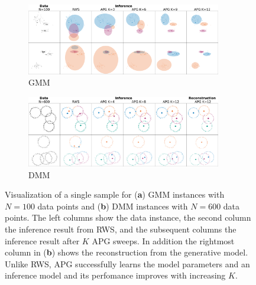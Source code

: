 \documentclass{article}
\theoremstyle{definition}
\begin{document}
\begin{figure}[t!]
  \centering
  \begin{subfigure}[t]{0.5\textwidth}
  \includegraphics[width=85mm]{figures/gmm_samples_2datasets.pdf}
  \vspace*{-1mm}
  \caption{GMM}
  \label{fig:samples-gmm}
  \vspace{-1ex}
  \end{subfigure}%
  \begin{subfigure}[t]{0.5\textwidth}
  \includegraphics[width=85mm]{figures/dgmm_samples_2datasets.pdf}
  \vspace*{-1mm}
  \caption{DMM}
  \label{fig:samples-dgmm}
  \vspace{-1ex}
  \end{subfigure}
  \caption{Visualization of a single sample for (\textbf{a}) GMM instances with $N=100$ data points and (\textbf{b}) DMM instances with $N=600$ data points. The left columns show the data instance, the second column the inference result from RWS, and the subsequent columns the inference result after $K$ APG sweeps. In addition the rightmost column in (\textbf{b}) shows the reconstruction from the generative model.
  Unlike RWS, APG successfully learns the model parameters and an inference model and its perfomance improves with increasing $K$.}
  \vspace{-0.25em}
  \label{fig:samples-mixture}
\end{figure}
\end{document}

